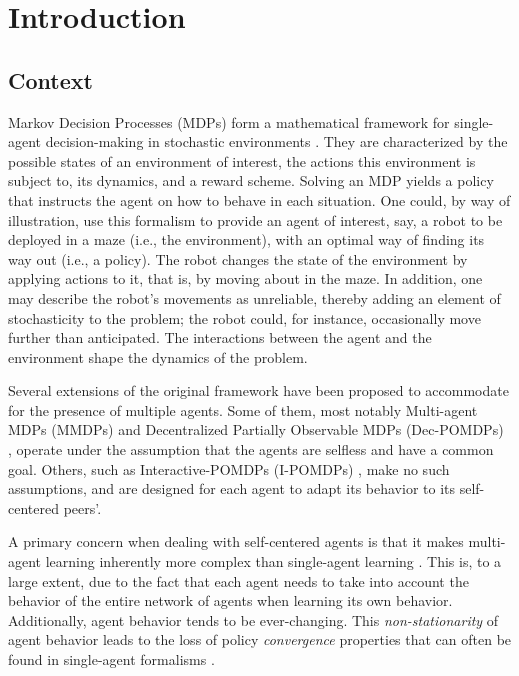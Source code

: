 
\chapter{Introduction}


\section{Context}



Markov Decision Processes (MDPs) form a mathematical framework for single-agent decision-making in stochastic environments \cite{Russell:2009:AIM:1671238}. They are characterized by the possible states of an environment of interest, the actions this environment is subject to, its dynamics, and a reward scheme. Solving an MDP yields a policy that instructs the agent on how to behave in each situation. One could, by way of illustration, use this formalism to provide an agent of interest, say, a robot to be deployed in a maze (i.e., the environment), with an optimal way of finding its way out (i.e., a policy). The robot changes the state of the environment by applying actions to it, that is, by moving about in the maze. In addition, one may describe the robot's movements as unreliable, thereby adding an element of stochasticity to the problem; the robot could, for instance, occasionally move further than anticipated. The interactions between the agent and the environment shape the dynamics of the problem.

Several extensions of the original framework have been proposed to accommodate for the presence of multiple agents. 
Some of them, most notably Multi-agent MDPs (MMDPs) \cite{Boutilier} and Decentralized Partially Observable MDPs (Dec-POMDPs) \cite{decmdp, decmdp2}, operate under the assumption that the agents are selfless and have a common goal. Others, such as Interactive-POMDPs (I-POMDPs) \cite{ipomdp}, make no such assumptions, and are designed for each agent to adapt its behavior to its self-centered peers'.


A primary concern when dealing with self-centered agents is that it makes multi-agent learning inherently more complex than single-agent learning \cite{nonstation, convergence}. This is, to a large extent, due to the fact that each agent needs to take into account the behavior of the entire network of agents when learning its own behavior. Additionally, agent behavior tends to be ever-changing. This \textit{non-stationarity} of agent behavior leads to the loss of policy \textit{convergence} properties that can often be found in single-agent formalisms \cite{convergence}. 


